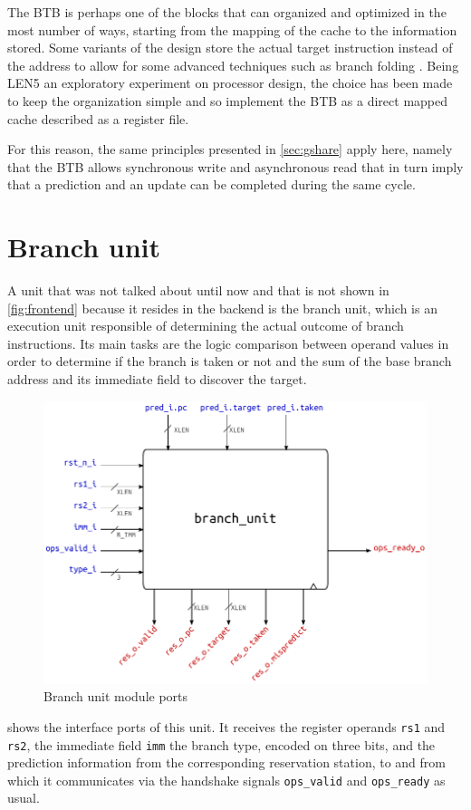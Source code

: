 \pagebreak
The \ac{BTB} is perhaps one of the blocks that can organized and optimized in the most number of ways, starting from the mapping of the cache to the information stored. Some variants of the design store the actual target instruction instead of the address to allow for some advanced techniques such as branch folding \cite{perleberg93}. Being LEN5 an exploratory experiment on processor design, the choice has been made to keep the organization simple and so implement the \ac{BTB} as a direct mapped cache described as a register file.

For this reason, the same principles presented in \cref{sec:gshare} apply here, namely that the \ac{BTB} allows synchronous write and asynchronous read that in turn imply that a prediction and an update can be completed during the same cycle.
\pagebreak
\section{Branch unit}
A unit that was not talked about until now and that is not shown in \cref{fig:frontend} because it resides in the backend is the branch unit, which is an execution unit responsible of determining the actual outcome of branch instructions. Its main tasks are the logic comparison between operand values in order to determine if the branch is taken or not and the sum of the base branch address and its immediate field to discover the target.

\begin{figure}[hbt]
  \centering
  \includegraphics[width=.9\textwidth]{img/branch_unit-top.pdf}
  \caption{Branch unit module ports}
  \label{fig:branch_unit-top}
\end{figure}
 shows the interface ports of this unit. It receives the register operands \texttt{rs1} and \texttt{rs2}, the immediate field \texttt{imm} the branch type, encoded on three bits, and the prediction information from the corresponding reservation station, to and from which it communicates via the handshake signals \texttt{ops\_valid} and \texttt{ops\_ready} as usual.

